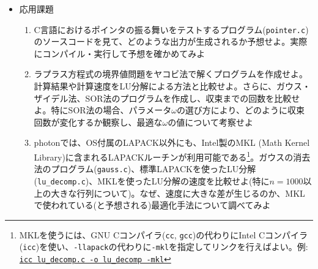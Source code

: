 \documentclass[11pt]{jarticle}
\begin{document}
\begin{itemize}
\item 応用課題
  \begin{enumerate}
  \item C言語におけるポインタの振る舞いをテストするプログラム({\tt pointer.c})のソースコードを見て、どのような出力が生成されるか予想せよ。実際にコンパイル・実行して予想を確かめてみよ
  \item ラプラス方程式の境界値問題をヤコビ法で解くプログラムを作成せよ。計算結果や計算速度をLU分解による方法と比較せよ。さらに、ガウス・ザイデル法、SOR法のプログラムを作成し、収束までの回数を比較せよ。特にSOR法の場合、パラメータ$\omega$の選び方により、どのように収束回数が変化するか観察し、最適な$\omega$の値について考察せよ
  \item photonでは、OS付属のLAPACK以外にも、Intel製のMKL (Math Kernel Library)に含まれるLAPACKルーチンが利用可能である\footnote{MKLを使うには、GNU Cコンパイラ({\tt cc}, {\tt gcc})の代わりにIntel Cコンパイラ({\tt icc})を使い、{\tt -llapack}の代わりに{\tt -mkl}を指定してリンクを行えばよい。例: \underline{\tt icc lu\_decomp.c -o lu\_decomp -mkl}}。ガウスの消去法のプログラム({\tt gauss.c})、標準LAPACKを使ったLU分解({\tt lu\_decomp.c})、MKLを使ったLU分解の速度を比較せよ(特に$n=1000$以上の大きな行列について)。なぜ、速度に大きな差が生じるのか、MKLで使われている(と予想される)最適化手法について調べてみよ
  \end{enumerate}  
\end{itemize}
\end{document}
